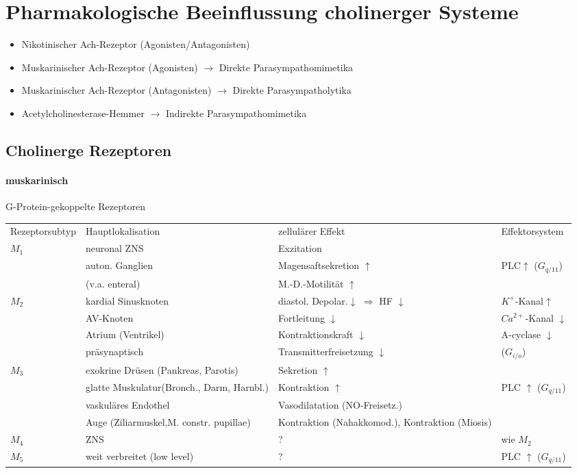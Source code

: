\documentclass[10pt,a4paper]{report}
\begin{document}
\section{Pharmakologische Beeinflussung cholinerger Systeme}
\begin{itemize}
	\item Nikotinischer Ach-Rezeptor (Agonisten/Antagonisten)
	\item Muskarinischer Ach-Rezeptor (Agonisten) $\rightarrow$ Direkte Parasympathomimetika
 	\item Muskarinischer Ach-Rezeptor (Antagonisten) 
   $\rightarrow$ Direkte Parasympatholytika
	\item Acetylcholinesterase-Hemmer 
   $\rightarrow$ Indirekte Parasympathomimetika
\end{itemize}
\subsection{Cholinerge Rezeptoren}
\paragraph{muskarinisch}
G-Protein-gekoppelte Rezeptoren\mbox{} \\
\begin{tabularx}{\textwidth}{XXXX}
Rezeptorsubtyp&Hauptlokalisation&zellulärer Effekt&Effektorsystem\\
$M_1$&neuronal ZNS&Exzitation &\\
&auton. Ganglien&Magensaftsekretion $\uparrow$&PLC$\uparrow$ ($G_{q/11}$)\\
&(v.a. enteral)&M.-D.-Motilität $\uparrow$&\\
$M_2$&kardial Sinusknoten&diastol. Depolar.$\downarrow$ $\Rightarrow$ HF $\downarrow$ &$K^+$-Kanal$\uparrow$\\
&AV-Knoten&Fortleitung $\downarrow$&$Ca^{2+}$-Kanal $\downarrow$\\ 
&Atrium (Ventrikel)&Kontraktionskraft $\downarrow$&A-cyclase $\downarrow$\\
&präsynaptisch&Transmitterfreisetzung $\downarrow$&($G_{i/o}$)\\
$M_3$&exokrine Drüsen (Pankreas, Parotis)&Sekretion $\uparrow$&\\
&glatte Muskulatur(Bronch., Darm, Harnbl.)&Kontraktion $\uparrow$&PLC $\uparrow$ ($G_{q/11}$)\\
&vaskuläres Endothel&Vasodilatation (NO-Freisetz.)&\\
&Auge (Ziliarmuskel,M. constr. pupillae)&Kontraktion (Nahakkomod.),  Kontraktion (Miosis)&\\
$M_4$&ZNS&?&wie $M_2$\\
$M_5$&weit verbreitet (low level)&?&PLC $\uparrow$ ($G_{q/11}$)\\
\end{tabularx}
\end{document}
